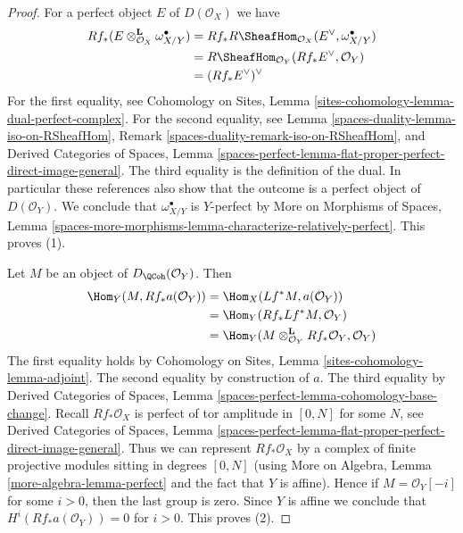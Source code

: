 \begin{proof}
For a perfect object $E$ of $D(\mathcal{O}_X)$ we have
\begin{align*}
Rf_*(E \otimes_{\mathcal{O}_X}^\mathbf{L} \omega_{X/Y}^\bullet)
& =
Rf_*R\SheafHom_{\mathcal{O}_X}(E^\vee, \omega_{X/Y}^\bullet) \\
& =
R\SheafHom_{\mathcal{O}_Y}(Rf_*E^\vee, \mathcal{O}_Y) \\
& =
(Rf_*E^\vee)^\vee
\end{align*}
For the first equality, see
Cohomology on Sites, Lemma \ref{sites-cohomology-lemma-dual-perfect-complex}.
For the second equality, see Lemma \ref{spaces-duality-lemma-iso-on-RSheafHom},
Remark \ref{spaces-duality-remark-iso-on-RSheafHom}, and
Derived Categories of Spaces, Lemma
\ref{spaces-perfect-lemma-flat-proper-perfect-direct-image-general}.
The third equality is the definition of the dual. In particular
these references also show that the outcome is a perfect object
of $D(\mathcal{O}_Y)$. We conclude that $\omega_{X/Y}^\bullet$
is $Y$-perfect by More on Morphisms of Spaces, Lemma
\ref{spaces-more-morphisms-lemma-characterize-relatively-perfect}.
This proves (1).

\medskip\noindent
Let $M$ be an object of $D_\QCoh(\mathcal{O}_Y)$. Then
\begin{align*}
\Hom_Y(M, Rf_*a(\mathcal{O}_Y)) & =
\Hom_X(Lf^*M, a(\mathcal{O}_Y)) \\
& =
\Hom_Y(Rf_*Lf^*M, \mathcal{O}_Y) \\
& =
\Hom_Y(M \otimes_{\mathcal{O}_Y}^\mathbf{L} Rf_*\mathcal{O}_Y, \mathcal{O}_Y)
\end{align*}
The first equality holds by Cohomology on Sites, Lemma
\ref{sites-cohomology-lemma-adjoint}.
The second equality by construction of $a$.
The third equality by Derived Categories of Spaces, Lemma
\ref{spaces-perfect-lemma-cohomology-base-change}.
Recall $Rf_*\mathcal{O}_X$ is perfect of tor amplitude in $[0, N]$
for some $N$, see
Derived Categories of Spaces, Lemma
\ref{spaces-perfect-lemma-flat-proper-perfect-direct-image-general}.
Thus we can represent $Rf_*\mathcal{O}_X$ by a complex of
finite projective modules sitting in degrees $[0, N]$
(using More on Algebra, Lemma \ref{more-algebra-lemma-perfect}
and the fact that $Y$ is affine).
Hence if $M = \mathcal{O}_Y[-i]$ for some $i > 0$, then the last
group is zero. Since $Y$ is affine we conclude that
$H^i(Rf_*a(\mathcal{O}_Y)) = 0$ for $i > 0$.
This proves (2).


\end{proof}
